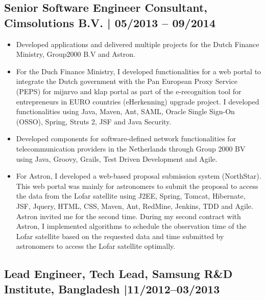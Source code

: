 \documentclass[12pt,parskip=half]{scrartcl}
\begin{document}
\subsection*{Senior Software Engineer Consultant, Cimsolutions B.V. | 05/2013 -- 09/2014}
\begin{itemize}

\item Developed applications and delivered multiple projects for the Dutch Finance Ministry, Group2000 B.V and Astron.
 
\item For the Duch Finance Ministry, I developed functionalities for a web portal to integrate the Dutch government with the Pan European Proxy Service (PEPS) for mijnrvo and klap portal as part of the e-recognition tool for entrepreneurs in EURO countries (eHerkenning) upgrade project. I developed functionalities using Java, Maven, Ant, SAML, Oracle Single Sign-On (OSSO), Spring, Struts 2, JSF and Java Security.

\item Developed components for software-defined network functionalities for telecommunication providers in the Netherlands through Group 2000 BV using Java, Groovy, Grails, Test Driven Development and Agile. 

 \item  For Astron, I developed a web-based proposal submission system (NorthStar). This web portal was mainly for astronomers to submit the proposal to access the data from the Lofar satellite using J2EE, Spring, Tomcat, Hibernate, JSF, Jquery, HTML, CSS, Maven, Ant, RedMine, Jenkins, TDD and Agile. Astron invited me for the second time. During my second contract with Astron, I implemented algorithms to schedule the observation time of the Lofar satellite based on the requested data and time submitted by astronomers to access the Lofar satellite optimally.

\end{itemize}


\subsection*{Lead Engineer, Tech Lead, Samsung R\&D Institute, Bangladesh |11/2012--03/2013 }
\end{document}
